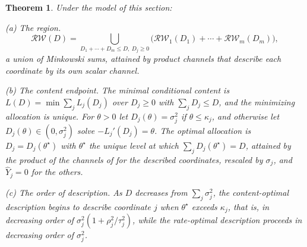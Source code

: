 \documentclass[11pt,onecolumn]{IEEEtran}
\newtheorem{theorem}{Theorem}
\newcommand{\hY}{\widehat{Y}}
\newcommand{\RW}{\mathcal{R}\!\mathcal{W}}
\begin{document}
\begin{theorem}\label{thm:parallel}
Under the model of this section:

\emph{(a) The region.}
\[
\RW(D)=\bigcup_{D_1+\cdots+D_m\le D,\ D_j\ge0}
\bigl(\RW_1(D_1)+\cdots+\RW_m(D_m)\bigr),
\]
a union of Minkowski sums, attained by product channels that describe
each coordinate by its own scalar channel.

\emph{(b) The content endpoint.} The minimal conditional content is
$L(D)=\min\sum_jL_j(D_j)$ over $D_j\ge0$ with $\sum_jD_j\le D$, and the
minimizing allocation is unique. For $\theta>0$ let
$D_j(\theta)=\sigma_j^2$ if $\theta\le\kappa_j$, and otherwise let
$D_j(\theta)\in(0,\sigma_j^2)$ solve $-L_j'(D_j)=\theta$. The optimal
allocation is $D_j=D_j(\theta^\star)$ with $\theta^\star$ the unique level
at which $\sum_jD_j(\theta^\star)=D$, attained by the product of the
channels of \cite[Theorem~14(a)]{bond2026tit} for the described
coordinates, rescaled by $\sigma_j$, and $\hY_j=0$ for the others.

\emph{(c) The order of description.} As $D$ decreases from
$\sum_j\sigma_j^2$, the content-optimal description begins to describe
coordinate $j$ when $\theta^\star$ exceeds $\kappa_j$, that is, in
decreasing order of $\sigma_j^2(1+\rho_j^2/\tau_j^2)$, while the
rate-optimal description proceeds in decreasing order of $\sigma_j^2$.
\end{theorem}
\end{document}
